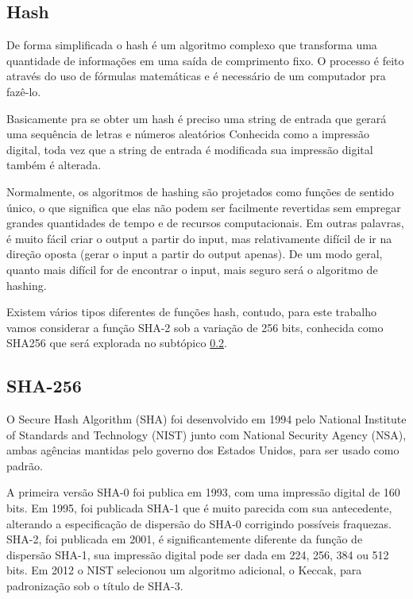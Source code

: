 \documentclass[12pt, a4paper]{report}
\begin{document}

\subsection{Hash}
\label{subsec:hash}
De forma simplificada o hash é um algoritmo complexo que  transforma uma quantidade de informações em uma saída de comprimento fixo. O processo é feito através do uso de fórmulas matemáticas e é necessário de um computador pra fazê-lo.

Basicamente pra se obter um hash é preciso uma string de entrada  que gerará uma sequência de letras e números aleatórios Conhecida como a impressão digital, toda vez que a string de entrada é modificada sua impressão digital também é alterada.

Normalmente, os algoritmos de hashing  são projetados como funções de sentido único, o que significa que elas não podem ser facilmente revertidas sem empregar grandes quantidades de tempo e de recursos computacionais. Em outras palavras, é muito fácil criar o output a partir do input, mas relativamente difícil de ir na direção oposta (gerar o input a partir do output apenas). De um modo geral, quanto mais difícil for de encontrar o input, mais seguro será o algoritmo de hashing.

Existem vários tipos diferentes de funções hash, contudo, para este trabalho vamos considerar a função SHA-2 sob a variação de 256 bits, conhecida como SHA256 que será explorada no subtópico \ref{subsec:sha256}.

\subsection{SHA-256}
\label{subsec:sha256}

O Secure Hash Algorithm (SHA) foi desenvolvido em 1994 pelo National Institute of Standards and Technology (NIST) junto com National Security Agency (NSA), ambas agências mantidas pelo governo dos Estados Unidos,  para ser usado como padrão.

A primeira versão SHA-0 foi publica em 1993, com uma impressão digital de 160 bits. Em 1995, foi publicada SHA-1 que é muito parecida com sua antecedente, alterando a especificação de dispersão do SHA-0 corrigindo possíveis fraquezas. SHA-2, foi publicada em 2001, é significantemente diferente da função de dispersão SHA-1, sua impressão digital pode ser dada em 224, 256, 384 ou 512 bits. Em 2012 o NIST selecionou um algoritmo adicional, o Keccak, para padronização sob o título de SHA-3.
\end{document}
